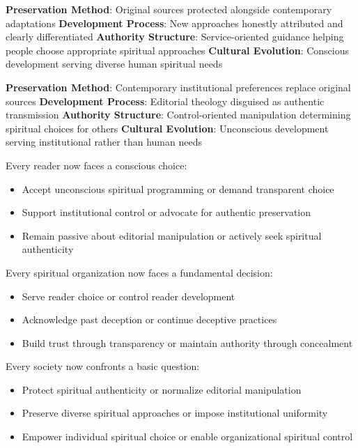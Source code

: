 \documentclass[12pt,twoside]{book}
\begin{document}
\textbf{\textbf{Preservation Method}}: Original sources protected alongside contemporary adaptations
\textbf{\textbf{Development Process}}: New approaches honestly attributed and clearly differentiated
\textbf{\textbf{Authority Structure}}: Service-oriented guidance helping people choose appropriate spiritual approaches
\textbf{\textbf{Cultural Evolution}}: Conscious development serving diverse human spiritual needs

\textbf{\textbf{Preservation Method}}: Contemporary institutional preferences replace original sources
\textbf{\textbf{Development Process}}: Editorial theology disguised as authentic transmission
\textbf{\textbf{Authority Structure}}: Control-oriented manipulation determining spiritual choices for others  
\textbf{\textbf{Cultural Evolution}}: Unconscious development serving institutional rather than human needs


Every reader now faces a conscious choice:
\begin{itemize}
\item Accept unconscious spiritual programming or demand transparent choice
\item Support institutional control or advocate for authentic preservation
\item Remain passive about editorial manipulation or actively seek spiritual authenticity
\end{itemize}

Every spiritual organization now faces a fundamental decision:
\begin{itemize}
\item Serve reader choice or control reader development
\item Acknowledge past deception or continue deceptive practices
\item Build trust through transparency or maintain authority through concealment
\end{itemize}

Every society now confronts a basic question:
\begin{itemize}
\item Protect spiritual authenticity or normalize editorial manipulation
\item Preserve diverse spiritual approaches or impose institutional uniformity
\item Empower individual spiritual choice or enable organizational spiritual control
\end{itemize}
\end{document}

